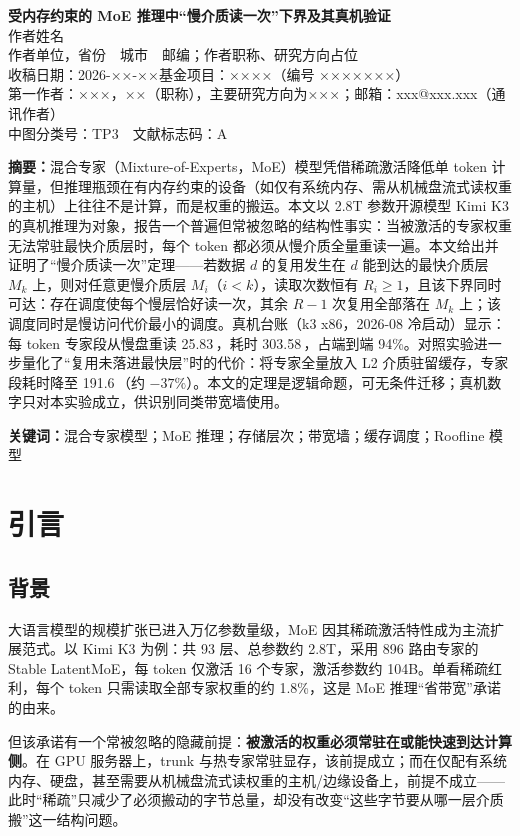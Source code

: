 \documentclass[11pt]{ctexart}
\title{\papertitle}
\author{\authorone}
\date{}
\makeatletter
\newcommand{\papertitle}{受内存约束的 MoE 推理中“慢介质读一次”下界及其真机验证}
\newcommand{\authorone}{作者姓名}
\newcommand{\affiliation}{作者单位，省份　城市　邮编；作者职称、研究方向占位}
\newcommand{\fund}{基金项目：××××（编号 ×××××××）}
\newcommand{\firstauthor}{第一作者：×××，××（职称），主要研究方向为×××}
\newcommand{\mailto}{邮箱：xxx@xxx.xxx（通讯作者）}
\newcommand{\clc}{中图分类号：TP3　文献标志码：A}
\newcommand{\received}{收稿日期：2026-××-××}
\makeatother
\begin{document}
\begin{center}
{\LARGE\bfseries\papertitle}\\[1.2em]
{\large \authorone}\\[0.6em]
{\small \affiliation}\\[0.8em]
{\small \received\quad \fund}\\[0.6em]
{\small \firstauthor；\mailto}\\
{\small \clc}
\end{center}

\vspace{0.8em}
\noindent\textbf{摘要：}混合专家（Mixture-of-Experts，MoE）模型凭借稀疏激活降低单 token 计算量，但推理瓶颈在有内存约束的设备（如仅有系统内存、需从机械盘流式读权重的主机）上往往不是计算，而是权重的搬运。本文以 2.8T 参数开源模型 Kimi K3 的真机推理为对象，报告一个普遍但常被忽略的结构性事实：当被激活的专家权重无法常驻最快介质层时，每个 token 都必须从慢介质全量重读一遍。本文给出并证明了“慢介质读一次”定理——若数据 $d$ 的复用发生在 $d$ 能到达的最快介质层 $M_k$ 上，则对任意更慢介质层 $M_i$（$i<k$），读取次数恒有 $R_i\ge 1$，且该下界同时可达：存在调度使每个慢层恰好读一次，其余 $R-1$ 次复用全部落在 $M_k$ 上；该调度同时是慢访问代价最小的调度。真机台账（k3 x86，2026-08 冷启动）显示：每 token 专家段从慢盘重读 25.83\,，耗时 303.58\,，占端到端 94\%。对照实验进一步量化了“复用未落进最快层”时的代价：将专家全量放入 L2 介质驻留缓存，专家段耗时降至 191.6\,（约 $-37\%$）。本文的定理是逻辑命题，可无条件迁移；真机数字只对本实验成立，供识别同类带宽墙使用。

\medskip
\noindent\textbf{关键词：}混合专家模型；MoE 推理；存储层次；带宽墙；缓存调度；Roofline 模型

\section{引言}

\subsection{背景}

大语言模型的规模扩张已进入万亿参数量级，MoE 因其稀疏激活特性成为主流扩展范式\cite{k3,shazeer17,gshard,switch,mixtral,dsmoe}。以 Kimi K3 为例\cite{k3}：共 93 层、总参数约 2.8T，采用 896 路由专家的 Stable LatentMoE，每 token 仅激活 16 个专家，激活参数约 104B。单看稀疏红利，每个 token 只需读取全部专家权重的约 1.8\%，这是 MoE 推理“省带宽”承诺的由来。

但该承诺有一个常被忽略的隐藏前提：\textbf{被激活的权重必须常驻在或能快速到达计算侧}。在 GPU 服务器上，trunk 与热专家常驻显存，该前提成立；而在仅配有系统内存、硬盘，甚至需要从机械盘流式读权重的主机/边缘设备上，前提不成立——此时“稀疏”只减少了必须搬动的字节总量，却没有改变“这些字节要从哪一层介质搬”这一结构问题。
\end{document}
